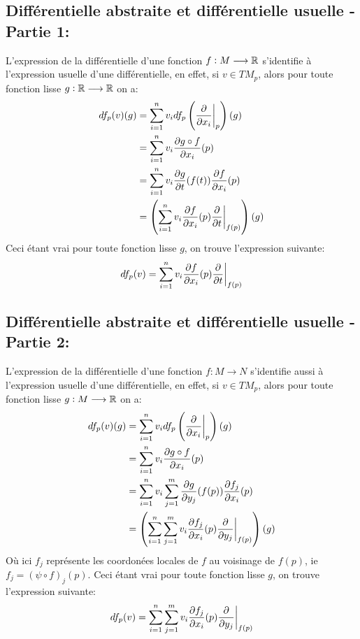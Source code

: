    \subsection*{Différentielle abstraite et différentielle usuelle - Partie 1:}
      L'expression de la différentielle d'une fonction \( f : M \longrightarrow \mathbb{R} \) s'identifie à l'expression usuelle d'une différentielle, en effet, si \( v \in TM_p \), alors pour toute fonction lisse \( g : \mathbb{R} \longrightarrow \mathbb{R} \) on a:
      \begin{align*}
         df_p(v)(g) &= \sum_{i=1}^n v_i df_p\left(\frac{\partial }{\partial x_i}\biggr|_p\right)(g)\\
         &= \sum_{i=1}^n v_i \frac{\partial g \circ f}{\partial x_i}(p)\\
         &= \sum_{i=1}^n v_i \frac{\partial g}{\partial t}(f(t))\frac{\partial f}{\partial x_i}(p)\\
         &= \left(\sum_{i=1}^n v_i \frac{\partial f}{\partial x_i}(p)\frac{\partial }{\partial t}\biggr|_{f(p)}\right)(g)
      \end{align*}
      Ceci étant vrai pour toute fonction lisse \( g \), on trouve l'expression suivante:
      \[ 
         df_p(v) = \sum_{i=1}^n v_i \frac{\partial f}{\partial x_i}(p)\frac{\partial }{\partial t}\biggr|_{f(p)}
      \]
   \subsection*{Différentielle abstraite et différentielle usuelle - Partie 2:}
      L'expression de la différentielle d'une fonction \( f : M \longrightarrow N \) s'identifie aussi à l'expression usuelle d'une différentielle, en effet, si \( v \in TM_p \), alors pour toute fonction lisse \( g : M \longrightarrow \mathbb{R} \) on a:
      \begin{align*}
         df_p(v)(g) &= \sum_{i=1}^n v_i df_p\left(\frac{\partial }{\partial x_i}\biggr|_p\right)(g)\\
         &= \sum_{i=1}^n v_i \frac{\partial g \circ f}{\partial x_i}(p)\\
         &= \sum_{i=1}^n v_i \sum_{j=1}^m \frac{\partial g}{\partial y_j}(f(p)) \frac{\partial f_j}{\partial x_i}(p)\\
         &= \left(\sum_{i=1}^n\sum_{j=1}^m v_i \frac{\partial f_j}{\partial x_i}(p)\frac{\partial }{\partial y_j}\biggr|_{f(p)}\right)(g)
      \end{align*}
      Où ici \( f_j \) représente les coordonées locales de \( f \) au voisinage de \( f(p) \), ie \( f_j = (\psi \circ f)_j(p) \). Ceci étant vrai pour toute fonction lisse \( g \), on trouve l'expression suivante:
      \[ 
         df_p(v) = \sum_{i=1}^n\sum_{j=1}^m v_i \frac{\partial f_j}{\partial x_i}(p)\frac{\partial }{\partial y_j}\biggr|_{f(p)}
      \]
